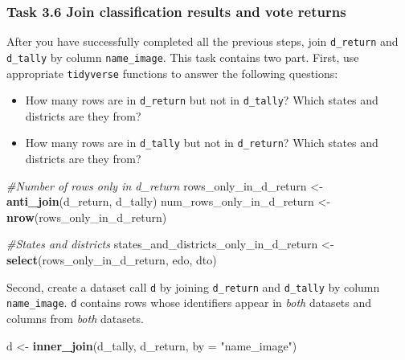 \documentclass[
]{article}
\newenvironment{Shaded}{\begin{snugshade}}{\end{snugshade}}
\newcommand{\AttributeTok}[1]{\textcolor[rgb]{0.13,0.29,0.53}{#1}}
\newcommand{\CommentTok}[1]{\textcolor[rgb]{0.56,0.35,0.01}{\textit{#1}}}
\newcommand{\FunctionTok}[1]{\textcolor[rgb]{0.13,0.29,0.53}{\textbf{#1}}}
\newcommand{\NormalTok}[1]{#1}
\newcommand{\OtherTok}[1]{\textcolor[rgb]{0.56,0.35,0.01}{#1}}
\newcommand{\StringTok}[1]{\textcolor[rgb]{0.31,0.60,0.02}{#1}}
\begin{document}
\clearpage

\hypertarget{task-3.6-join-classification-results-and-vote-returns}{%
\subsubsection{Task 3.6 Join classification results and vote
returns}\label{task-3.6-join-classification-results-and-vote-returns}}

After you have successfully completed all the previous steps, join
\texttt{d\_return} and \texttt{d\_tally} by column \texttt{name\_image}.
This task contains two part. First, use appropriate \texttt{tidyverse}
functions to answer the following questions:

\begin{itemize}
\item
  How many rows are in \texttt{d\_return} but not in \texttt{d\_tally}?
  Which states and districts are they from?
\item
  How many rows are in \texttt{d\_tally} but not in \texttt{d\_return}?
  Which states and districts are they from?
\end{itemize}

\begin{Shaded}
\begin{Highlighting}[]
\CommentTok{\#Number of rows only in d\_return}
\NormalTok{rows\_only\_in\_d\_return }\OtherTok{\textless{}{-}} \FunctionTok{anti\_join}\NormalTok{(d\_return, d\_tally)}
\NormalTok{num\_rows\_only\_in\_d\_return }\OtherTok{\textless{}{-}} \FunctionTok{nrow}\NormalTok{(rows\_only\_in\_d\_return)}

\CommentTok{\#States and districts }
\NormalTok{states\_and\_districts\_only\_in\_d\_return }\OtherTok{\textless{}{-}} \FunctionTok{select}\NormalTok{(rows\_only\_in\_d\_return, edo, dto)}
\end{Highlighting}
\end{Shaded}

Second, create a dataset call \texttt{d} by joining \texttt{d\_return}
and \texttt{d\_tally} by column \texttt{name\_image}. \texttt{d}
contains rows whose identifiers appear in \emph{both} datasets and
columns from \emph{both} datasets.

\begin{Shaded}
\begin{Highlighting}[]
\NormalTok{d }\OtherTok{\textless{}{-}} \FunctionTok{inner\_join}\NormalTok{(d\_tally, d\_return, }\AttributeTok{by =} \StringTok{"name\_image"}\NormalTok{)}
\end{Highlighting}
\end{Shaded}
\end{document}
